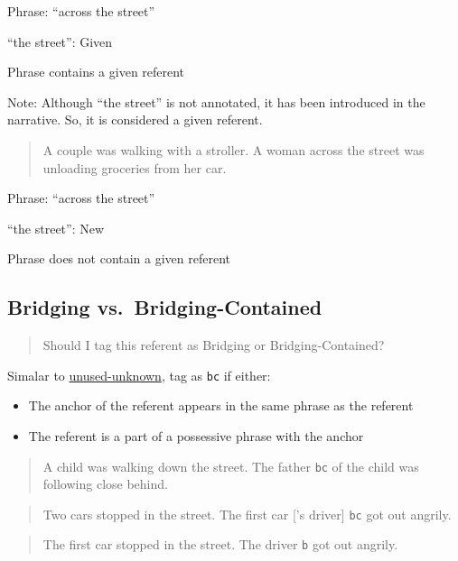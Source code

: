 \documentclass[
]{book}
\providecommand{\tightlist}{%
  \setlength{\itemsep}{0pt}\setlength{\parskip}{0pt}}
\begin{document}
Phrase: ``across the street''

``the street'': Given

Phrase contains a given referent

Note: Although ``the street'' is not annotated, it has been introduced in the narrative.
So, it is considered a given referent.

\begin{quote}
A couple was walking with a stroller.
A woman across the street was unloading groceries from her car.
\end{quote}

Phrase: ``across the street''

``the street'': New

Phrase does not contain a given referent

\hypertarget{bridging-vs.-bridging-contained}{%
\subsection{Bridging vs.~Bridging-Contained}\label{bridging-vs.-bridging-contained}}

\begin{quote}
Should I tag this referent as Bridging or Bridging-Contained?
\end{quote}

Simalar to \protect\hyperlink{new-vs.-unused-unknown}{unused-unknown}, tag as \texttt{bc} if either:

\begin{itemize}
\tightlist
\item
  The anchor of the referent appears in the same phrase as the referent
\item
  The referent is a part of a possessive phrase with the anchor
\end{itemize}

\begin{quote}
A child was walking down the street.
The father \texttt{bc} of the child was following close behind.
\end{quote}

\begin{quote}
Two cars stopped in the street.
The first car {[}'s driver{]} \texttt{bc} got out angrily.
\end{quote}

\begin{quote}
The first car stopped in the street.
The driver \texttt{b} got out angrily.
\end{quote}
\end{document}
